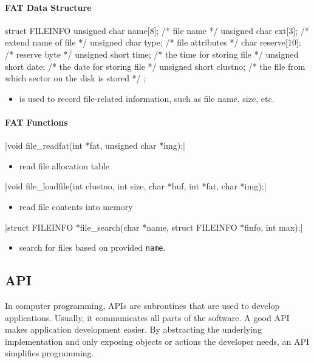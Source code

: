 \documentclass{swfcthesis}
\begin{document}
\paragraph{FAT Data Structure}

\begin{codeblock}[1]
\begin{ccode}
struct FILEINFO
{ 
  unsigned char name[8];   /* file name */
  unsigned char ext[3];    /* extend name of file */
  unsigned char type;      /* file attributes */
  char reserve[10];        /* reserve byte */
  unsigned short time;     /* the time for storing file */
  unsigned short date;     /* the date for storing file */
  unsigned short  clustno; /* the file from which sector on the disk is stored */
};
\end{ccode}
\end{codeblock}
\begin{itemize}
\item is used to record file-related information, such as file name, size, etc.
\end{itemize}

\paragraph{FAT Functions}

\csingle|void file_readfat(int *fat, unsigned char *img);|
\begin{itemize}
\item read file allocation table
\end{itemize}

\csingle|void file_loadfile(int clustno, int size, char *buf, int *fat, char *img);|
\begin{itemize}
\item read file contents into memory
\end{itemize}

\csingle|struct FILEINFO *file_search(char *name, struct FILEINFO *finfo, int max);|
\begin{itemize}
\item search for files based on provided \texttt{name}.
\end{itemize}

\subsection{API}
\label{sec:api}
In computer programming, APIs are subroutines that are used to develop
applications. Usually, it communicates all parts of the software. A good API makes
application development easier. By abstracting the underlying implementation and only
exposing objects or actions the developer needs, an API simplifies programming.
\end{document}
